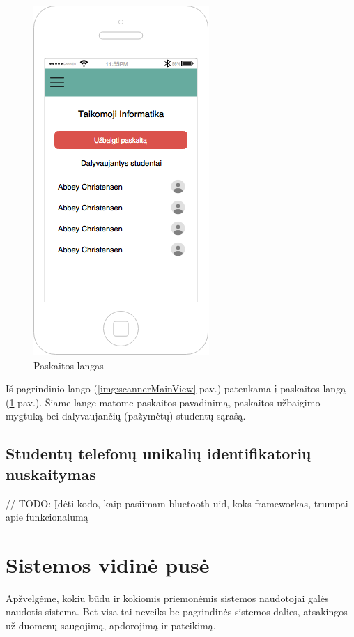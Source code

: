\documentclass{VUMIFPSbakalaurinis}
\begin{document}
\begin{figure}[H]
	\centering
	\includegraphics[scale=0.5]{img/kursinio_app_dest_lecture}
	\caption{Paskaitos langas}
	\label{img:scannerLectureView}
\end{figure}

Iš pagrindinio lango (\ref{img:scannerMainView} pav.) patenkama į paskaitos langą (\ref{img:scannerLectureView} pav.). Šiame lange matome paskaitos pavadinimą, paskaitos užbaigimo mygtuką bei dalyvaujančių (pažymėtų) studentų sąrašą.

\subsection{Studentų telefonų unikalių identifikatorių nuskaitymas}

// TODO: Įdėti kodo, kaip pasiimam bluetooth uid, koks frameworkas, trumpai apie funkcionalumą

\section{Sistemos vidinė pusė}

Apžvelgėme, kokiu būdu ir kokiomis priemonėmis sistemos naudotojai galės naudotis sistema. Bet visa tai neveiks be pagrindinės sistemos dalies, atsakingos už duomenų saugojimą, apdorojimą ir pateikimą.
\end{document}
